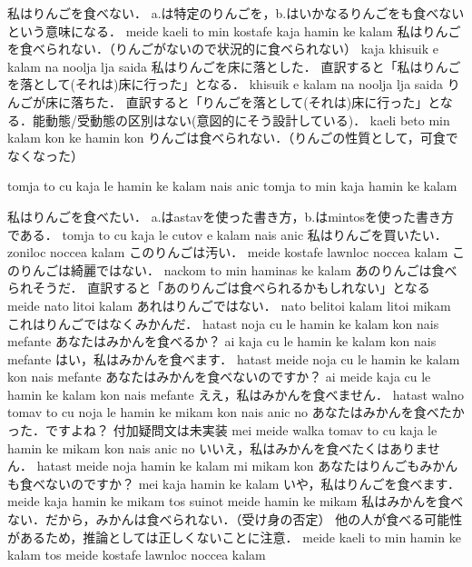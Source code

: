 \documentclass[../../main-detail.tex]{subfiles}
\begin{document}
\begin{exe}
    \glt 私はりんごを食べない．
    \glt a.は特定のりんごを，b.はいかなるりんごをも食べないという意味になる．
    \ex meide kaeli to min kostafe kaja hamin ke kalam
    \glt 私はりんごを食べられない．（りんごがないので状況的に食べられない）
    \ex kaja khisuik e kalam na noolja lja saida
    \glt 私はりんごを床に落とした．
    \glt 直訳すると「私はりんごを落として(それは)床に行った」となる．
    \ex khisuik e kalam na noolja lja saida
    \glt りんごが床に落ちた．
    \glt 直訳すると「りんごを落として(それは)床に行った」となる．能動態/受動態の区別はない(意図的にそう設計している)．
    \ex kaeli beto min kalam kon ke hamin kon
    \glt りんごは食べられない．（りんごの性質として，可食でなくなった）
    \ex \begin{xlist}
        \ex tomja to cu kaja le hamin ke kalam nais anic
        \ex tomja to min kaja hamin ke kalam
    \end{xlist}
    \glt 私はりんごを食べたい．
    \glt a.はastavを使った書き方，b.はmintosを使った書き方である．
    \ex tomja to cu kaja le cutov e kalam nais anic
    \glt 私はりんごを買いたい．
    \ex zoniloc noccea kalam
    \glt このりんごは汚い．
    \ex meide kostafe lawnloc noccea kalam
    \glt このりんごは綺麗ではない．
    \ex nackom to min haminas ke kalam
    \glt あのりんごは食べられそうだ．
    \glt 直訳すると「あのりんごは食べられるかもしれない」となる
    \ex meide nato litoi kalam
    \glt あれはりんごではない．
    \ex nato belitoi kalam litoi mikam
    \glt これはりんごではなくみかんだ．
    \ex hatast noja cu le hamin ke kalam kon nais mefante
    \glt あなたはみかんを食べるか？
    \ex ai kaja cu le hamin ke kalam kon nais mefante
    \glt はい，私はみかんを食べます．
    \ex hatast meide noja cu le hamin ke kalam kon nais mefante
    \glt あなたはみかんを食べないのですか？
    \ex ai meide kaja cu le hamin ke kalam kon nais mefante
    \glt ええ，私はみかんを食べません．
    \ex hatast walno tomav to cu noja le hamin ke mikam kon nais anic no
    \glt あなたはみかんを食べたかった．ですよね？
    \glt 付加疑問文は未実装
    \ex mei meide walka tomav to cu kaja le hamin ke mikam kon nais anic no
    \glt いいえ，私はみかんを食べたくはありません．
    \ex hatast meide noja hamin ke kalam mi mikam kon
    \glt あなたはりんごもみかんも食べないのですか？
    \ex mei kaja hamin ke kalam
    \glt いや，私はりんごを食べます．
    \ex meide kaja hamin ke mikam tos suinot meide hamin ke mikam
    \glt 私はみかんを食べない．だから，みかんは食べられない．（受け身の否定）
    \glt 他の人が食べる可能性があるため，推論としては正しくないことに注意．
    \ex meide kaeli to min hamin ke kalam tos meide kostafe lawnloc noccea kalam

\end{exe}
\end{document}
